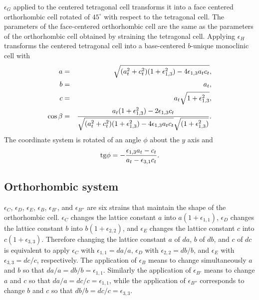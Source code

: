 \documentclass[12pt,a4paper]{article}
\begin{document}
$\epsilon_G$ applied to the centered tetragonal cell transforms it into
a face centered orthorhombic cell rotated of $45^\circ$ with respect to 
the tetragonal cell. The parameters of the face-centered orthorhombic cell 
are the same as the parameters of the orthorhombic cell obtained by
straining the tetragonal cell. 
Applying $\epsilon_H$ transforms the centered tetragonal cell into 
a base-centered $b$-unique monoclinic cell with
\begin{eqnarray}
a&=&\sqrt{(a_t^2+c_t^2)(1+\epsilon_{1,3}^2)-4\epsilon_{1,3}a_tc_t}, \\
b&=&a_t, \\
c&=&a_t \sqrt{1+\epsilon_{1,3}^2}, \\
\cos\beta &=& {a_t (1+\epsilon_{1,3}^2) -2 \epsilon_{1,3} c_t \over 
\sqrt{(a_t^2+c_t^2)(1+\epsilon_{1,3}^2)-4\epsilon_{1,3}a_tc_t} 
\sqrt{(1+\epsilon_{1,3}^2)}}.
\end{eqnarray}
The coordinate system is rotated of an angle $\phi$ about the $y$ axis
and 
\begin{equation}
{\rm tg} \phi = -{\epsilon_{1,3} a_t - c_t \over a_t - \epsilon_{3,1} c_t}.
\end{equation}

\subsection{\color{web-blue}Orthorhombic system}
$\epsilon_C$, $\epsilon_D$, $\epsilon_E$, $\epsilon_B$, $\epsilon_{B'}$,
and $\epsilon_{B''}$ are six strains that maintain the shape of the 
orthorhombic cell. $\epsilon_C$ changes the lattice constant $a$ into 
$a(1+\epsilon_{1,1})$, $\epsilon_D$ changes the lattice constant $b$ 
into $b(1+\epsilon_{2,2})$, and 
$\epsilon_E$ changes the lattice constant $c$ into $c(1+\epsilon_{3,3})$. 
Therefore changing the lattice constant $a$ of $da$,
$b$ of $db$, and $c$ of $dc$ is equivalent to apply $\epsilon_C$
with $\epsilon_{1,1}=da/a$, $\epsilon_D$ with $\epsilon_{2,2}=db/b$,
and $\epsilon_E$ with $\epsilon_{3,3}=dc/c$, respectively.
The application of $\epsilon_B$ means to change simultaneously
$a$ and $b$ so that $da/a=db/b=\epsilon_{1,1}$. Similarly the application
of $\epsilon_{B'}$ means to change $a$ and $c$ so that 
$da/a=dc/c=\epsilon_{1,1}$, while the application of $\epsilon_{B''}$ 
corresponds to change $b$ and $c$ so that $db/b=dc/c=\epsilon_{3,3}$.
\end{document}
